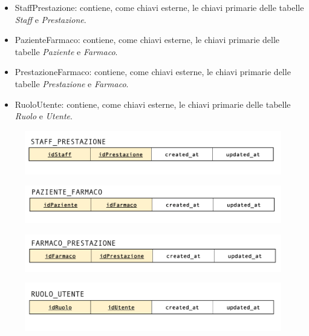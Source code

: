 \documentclass[paper=a4, fontsize=11pt,x11names]{report}
\begin{document}
\begin{itemize}
\item StaffPrestazione: contiene, come chiavi esterne, le chiavi primarie delle tabelle \textit{Staff} e \textit{Prestazione}.
\item PazienteFarmaco: contiene, come chiavi esterne, le chiavi primarie delle tabelle \textit{Paziente} e \textit{Farmaco}.
\item PrestazioneFarmaco: contiene, come chiavi esterne, le chiavi primarie delle tabelle \textit{Prestazione} e \textit{Farmaco}.
\item RuoloUtente: contiene, come chiavi esterne, le chiavi primarie delle tabelle \textit{Ruolo} e \textit{Utente}.
\end{itemize}

\begin{figure}[H]
\begin{center}
\includegraphics[scale=0.3]{staffPrestazioneSchema}
\end{center}
\end{figure}

\begin{figure}[H]
\begin{center}
\includegraphics[scale=0.3]{pazienteFarmacoSchema}
\end{center}
\end{figure}

\begin{figure}[H]
\begin{center}
\includegraphics[scale=0.3]{farmacoPrestazioneSchema}
\end{center}
\end{figure}

\begin{figure}[H]
\begin{center}
\includegraphics[scale=0.26]{permessiUtenteSchema}
\end{center}
\end{figure}
\end{document}

